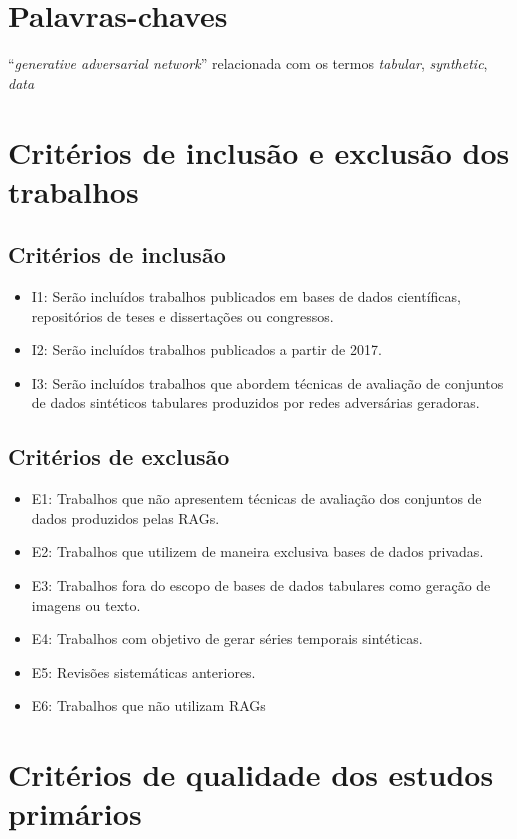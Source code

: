 \section{Palavras-chaves}
``\textit{generative adversarial network}'' relacionada com os termos \textit{tabular}, \textit{synthetic}, \textit{data}

\section{Critérios de inclusão e exclusão dos trabalhos}
\label{criteria}
\subsection{Critérios de inclusão}
\begin{itemize}
    \item I1: Serão incluídos trabalhos publicados em bases de dados científicas, repositórios de teses e dissertações ou congressos.
    \item I2: Serão incluídos trabalhos publicados a partir de 2017.
    \item I3: Serão incluídos trabalhos que abordem técnicas de avaliação de conjuntos de dados sintéticos tabulares produzidos por redes adversárias geradoras.
\end{itemize}

\subsection{Critérios de exclusão}
\begin{itemize}
    \item E1: Trabalhos que não apresentem técnicas de avaliação dos conjuntos de dados produzidos pelas RAGs.
    \item E2: Trabalhos que utilizem de maneira exclusiva bases de dados privadas.
    \item E3: Trabalhos fora do escopo de bases de dados tabulares como geração de imagens ou texto.
    \item E4: Trabalhos com objetivo de gerar séries temporais sintéticas.
    \item E5: Revisões sistemáticas anteriores.
    \item E6: Trabalhos que não utilizam RAGs
\end{itemize}


\section{Critérios de qualidade dos estudos primários}

